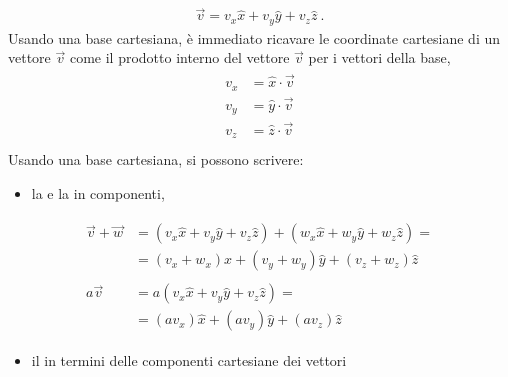 \documentclass[letterpaper,10pt,italian]{jupyterBook}
\begin{document}
\begin{equation*}
\begin{split}\vec{v} = v_x \hat{x} + v_y \hat{y} + v_z \hat{z} \ .\end{split}
\end{equation*}
\sphinxAtStartPar
Usando una base cartesiana, è immediato ricavare le coordinate cartesiane di un vettore \(\vec{v}\) come il prodotto interno del vettore \(\vec{v}\) per i vettori della base,
\begin{equation*}
\begin{split}\begin{aligned}
  v_x & = \hat{x} \cdot \vec{v} \\
  v_y & = \hat{y} \cdot \vec{v} \\
  v_z & = \hat{z} \cdot \vec{v} \\
\end{aligned}\end{split}
\end{equation*}
\sphinxAtStartPar
Usando una base cartesiana, si possono scrivere:
\begin{itemize}
\item {} 
\sphinxAtStartPar
la  e la  in componenti,

\end{itemize}
\begin{equation*}
\begin{split}\begin{aligned}
     \vec{v} + \vec{w} & =   (v_x \hat{x} + v_y \hat{y} + v_z \hat{z}) + (w_x \hat{x} + w_y \hat{y} + w_z \hat{z}) = \\
                       & =   (v_x + w_x) \hat{x} + (v_y + w_y) \hat{y} + (v_z + w_z) \hat{z} \\ \\
   a \vec{v}           & = a (v_x \hat{x} + v_y \hat{y} + v_z \hat{z}) = \\
                       & =   ( a v_x ) \hat{x} + ( a v_y ) \hat{y} + ( a v_z ) \hat{z}
  \end{aligned}\end{split}
\end{equation*}\begin{itemize}
\item {} 
\sphinxAtStartPar
il  in termini delle componenti cartesiane dei vettori

\end{itemize}
\end{document}

